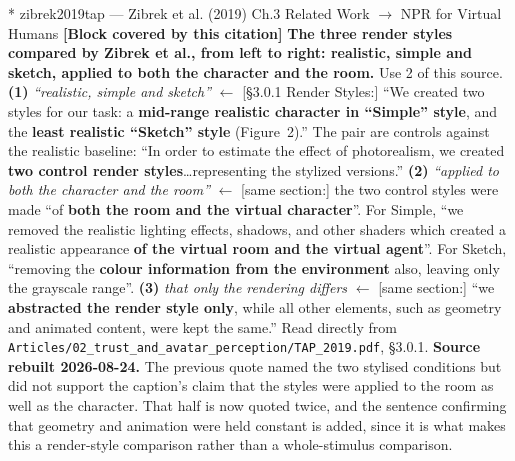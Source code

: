 \documentclass[11pt, a4paper]{article}
\makeatletter
\newcounter{citentry}
\newcommand{\citentry@core}[7]{%
  \stepcounter{citentry}
  \begingroup
  \sbox{\citentry@measurebox}{%
    \begin{minipage}{\linewidth}
      \noindent\colorbox{konstanzblue}{\parbox{\dimexpr\linewidth-2\fboxsep}{%
        \vspace{3pt}
        \textbf{\#\thecitentry \quad #2} \hfill \textit{#3}
        \vspace{3pt}
      }}
      \vspace{3pt}
      \noindent\begin{tabular}{@{}p{2.7cm} p{\dimexpr\linewidth-3cm}@{}}
        \textit{\small Sentence in thesis:} & #4 \\[5pt]
        \textbf{Usage:}\hfill       & #5 \\[5pt]
        \textit{\small Original source:}     & #6 \\[5pt]
        \textbf{How to check:}             & #7 \\
      \end{tabular}
      \vspace{5pt}
      \rule{10pt}{10pt}\quad \textbf{Validated} --- I have read the original and agree it supports the sentence.
    \end{minipage}%
  }%
  \Needspace{\dimexpr\ht\citentry@measurebox+\dp\citentry@measurebox\relax}%
  \endgroup
  \vspace{10pt}
  \noindent\colorbox{konstanzblue}{\parbox{\dimexpr\linewidth-2\fboxsep}{%
    \vspace{3pt}
    \textcolor{white}{\textbf{\#\thecitentry \quad #2}} \hfill \textcolor{white}{\textit{#3}}
    \vspace{3pt}
  }}
  \vspace{3pt}
  \noindent\begin{tabular}{@{}p{2.7cm} p{\dimexpr\linewidth-3cm}@{}}
    \textit{\small Sentence in thesis:} & \textcolor{darkgreen}{#4} \\[5pt]
    \textbf{Usage:}\hfill       & #5 \\[5pt]
    \textit{\small Original source:}     & \textcolor{darkred}{#6} \\[5pt]
    \textbf{How to check:}             & #7 \\
  \end{tabular}
  \vspace{5pt}
  \noindent\CheckBox[name=verified\thecitentry, width=10pt, height=10pt, bordercolor={0 0 0}, borderwidth=0.75, backgroundcolor={1 1 1}#1]{}\quad \textbf{Validated} --- I have read the original and agree it supports the sentence.
  \vspace{3pt}
  \noindent\textcolor{midgray}{\rule{\linewidth}{0.4pt}}
}
\newcommand{\citentry}{\@ifstar{\citentry@core{, checked}}{\citentry@core{}}}
\makeatother
\begin{document}
\begin{Form}
\citentry*
  {zibrek2019tap --- Zibrek et al. (2019)}
  {Ch.3 Related Work $\rightarrow$ NPR for Virtual Humans}
  {\textbf{[Block covered by this citation]} \textbf{The three render styles compared by Zibrek et al., from left to right: realistic, simple and sketch, applied to both the character and the room.}}
  {Use 2 of this source.}
  {\textbf{(1)} \emph{``realistic, simple and sketch''} $\leftarrow$ [\S3.0.1 Render Styles:] ``We created two styles for our task: a \textbf{mid-range realistic character in ``Simple'' style}, and the \textbf{least realistic ``Sketch'' style} (Figure~2).'' The pair are controls against the realistic baseline: ``In order to estimate the effect of photorealism, we created \textbf{two control render styles}\ldots representing the stylized versions.'' \quad \textbf{(2)} \emph{``applied to both the character and the room''} $\leftarrow$ [same section:] the two control styles were made ``of \textbf{both the room and the virtual character}''. For Simple, ``we removed the realistic lighting effects, shadows, and other shaders which created a realistic appearance \textbf{of the virtual room and the virtual agent}''. For Sketch, ``removing the \textbf{colour information from the environment} also, leaving only the grayscale range''. \quad \textbf{(3)} \emph{that only the rendering differs} $\leftarrow$ [same section:] ``we \textbf{abstracted the render style only}, while all other elements, such as geometry and animated content, were kept the same.''}
  {Read directly from \texttt{\footnotesize Articles/02\_trust\_and\_avatar\_perception/TAP\_2019.pdf}, \S3.0.1. \textbf{Source rebuilt 2026-08-24.} The previous quote named the two stylised conditions but did not support the caption's claim that the styles were applied to the room as well as the character. That half is now quoted twice, and the sentence confirming that geometry and animation were held constant is added, since it is what makes this a render-style comparison rather than a whole-stimulus comparison.}


\end{Form}
\end{document}
